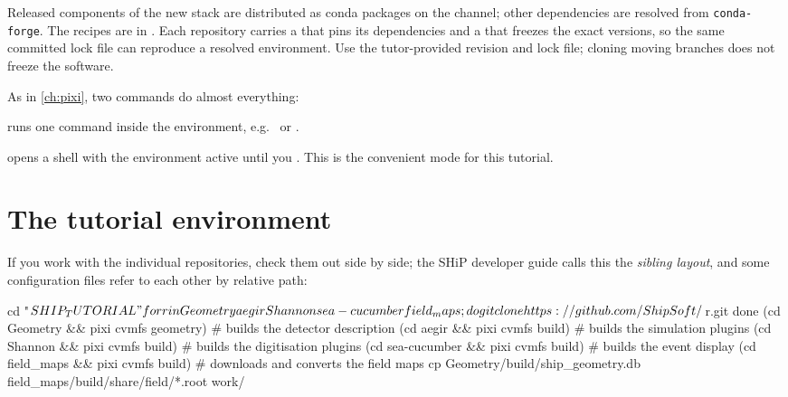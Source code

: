 Released components of the new stack are distributed as conda packages on the
\href{https://prefix.dev/channels/ship-experiment}{}
channel; other dependencies are resolved from \texttt{conda-forge}. The recipes are in . Each
repository carries a  that pins its dependencies and a
 that freezes the exact versions, so the same committed lock file can reproduce a resolved environment.
Use the tutor-provided revision and lock file; cloning moving branches does
not freeze the software.

\begin{note}
As in \cref{ch:pixi}, two commands do almost everything:
\begin{description}[style=nextline]
  \item[\cmd{pixi cvmfs <task or command>}] runs one command inside the
    environment, e.g.\  or .
  \item[\cmd{pixi cvmfs}] opens a shell with the environment active until you
    . This is the convenient mode for this tutorial.
\end{description}
\end{note}

\section{The tutorial environment}


If you work with the individual repositories, check them out side by side;
the SHiP developer guide calls this the \emph{sibling layout}, and some
configuration files refer to each other by relative path:

\begin{shell}
cd "$SHIP_TUTORIAL"
for r in Geometry aegir Shannon sea-cucumber field_maps; do
  git clone https://github.com/ShipSoft/$r.git
done
(cd Geometry && pixi cvmfs geometry)   # builds the detector description
(cd aegir    && pixi cvmfs build)      # builds the simulation plugins
(cd Shannon  && pixi cvmfs build)      # builds the digitisation plugins
(cd sea-cucumber && pixi cvmfs build) # builds the event display
(cd field_maps && pixi cvmfs build)   # downloads and converts the field maps
cp Geometry/build/ship_geometry.db field_maps/build/share/field/*.root work/
\end{shell}

